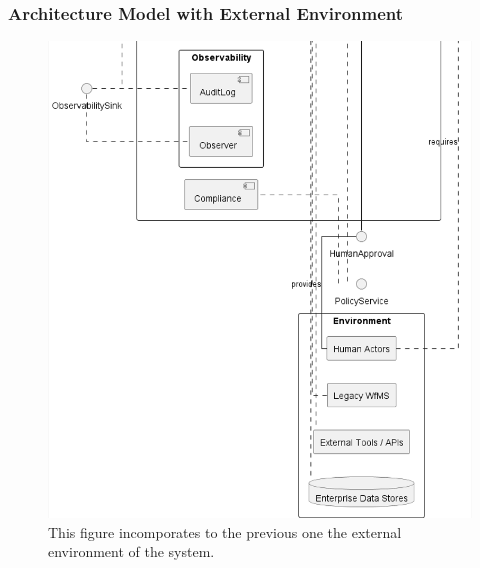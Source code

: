 \subsubsection*{Architecture Model with External Environment}
\begin{figure}[htbp]
  \centering
  \includegraphics[width=\linewidth]{ressources/MAS/diagrams/MAS_arch_and_environment2.png}
  \caption{This figure incomporates to the previous one the external environment of the system.}
  \label{fig:app-mas-arch-mod}
\end{figure}

\clearpage
